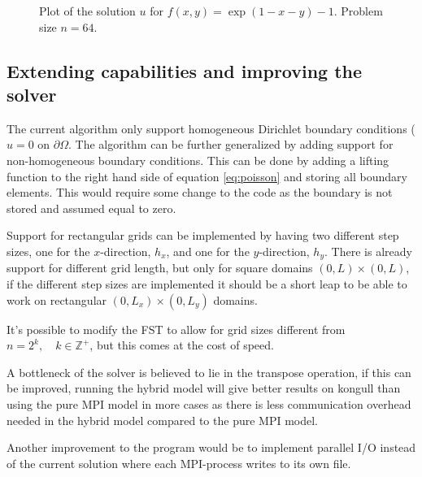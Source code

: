 \documentclass[11pt,a4paper,english]{article}
\numberwithin{figure}{subsection}
\numberwithin{table}{subsection}
\begin{document}
\begin{figure}[p]
	\centering
	
	\caption{Plot of the solution $u$ for $f(x,y) = \exp(1-x-y)-1$. Problem size $n=64$.}
	\label{fig:sol4}
\end{figure}


\subsection{Extending capabilities and improving the solver}
The current algorithm only support homogeneous Dirichlet boundary conditions ($u = 0 \text{ on } \partial\Omega$. The algorithm can be further generalized by adding support for non-homogeneous boundary conditions. This can be done by adding a lifting function to the right hand side of equation \eqref{eq:poisson} and storing all boundary elements. This would require some change to the code as the boundary is not stored and assumed equal to zero.

Support for rectangular grids can be implemented by having two different step sizes, one for the $x$-direction, $h_x$, and one for the $y$-direction, $h_y$. There is already support for different grid length, but only for square domains $(0,L)\times(0,L)$, if the different step sizes are implemented it should be a short leap to be able to work on rectangular $(0,L_x)\times(0,L_y)$ domains.

It's possible to modify the FST to allow for grid sizes different from $n=2^k,\quad k\in\mathbb{Z}^+$, but this comes at the cost of speed.

A bottleneck of the solver is believed to lie in the transpose operation, if this can be improved, running the hybrid model will give better results on kongull than using the pure MPI model in more cases as there is less communication overhead needed in the hybrid model compared to the pure MPI model.

Another improvement to the program would be to implement parallel I/O instead of the current solution where each MPI-process writes to its own file.

\nocite{lecturenotes}
\newpage


\end{document}
